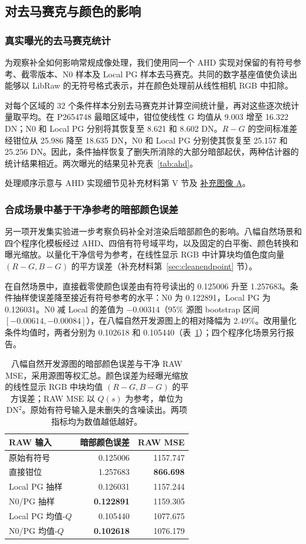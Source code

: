 \documentclass[10pt,twocolumn,journal]{IEEEtran}
\begin{document}
\subsection{对去马赛克与颜色的影响}\label{sec:downstream}
\subsubsection{真实曝光的去马赛克统计}
为观察补全如何影响常规成像处理，我们使用同一个 AHD 实现对保留的有符号参考、截零版本、N0 样本及 Local PG 样本去马赛克。共同的数字基座值使负读出能够以 LibRaw 的无符号格式表示，并在颜色处理前从线性相机 RGB 中扣除。

对每个区域的 32 个条件样本分别去马赛克并计算空间统计量，再对这些逐次统计量取平均。在 P2654748 最暗区域中，钳位使线性 G 均值从 9.003 增至 16.322 DN；N0 和 Local PG 分别将其恢复至 8.621 和 8.602 DN。$R-G$ 的空间标准差经钳位从 25.986 降至 18.635 DN，N0 和 Local PG 分别使其恢复至 25.157 和 25.256 DN。因此，条件抽样恢复了删失所消除的大部分暗部起伏，两种估计器的统计结果相近。两次曝光的结果见补充表~\ref{tab:ahd}。

处理顺序示意与 AHD 实现细节见补充材料第 V 节及 \href{visual_zh.pdf}{补充图像 A}。

\subsubsection{合成场景中基于干净参考的暗部颜色误差}
另一项开发集实验进一步考察负码补全对渲染后暗部颜色的影响。八幅自然场景和四个程序化模板经过 AHD、四倍有符号域平均，以及固定的白平衡、颜色转换和曝光缩放。以量化干净信号为参考，在线性显示 RGB 中计算块均值色度向量 $(R-G,B-G)$ 的平方误差（补充材料第~\ref{sec:cleanendpoint} 节）。

在自然场景中，直接截零使颜色误差由有符号读出的 0.125006 升至 1.257683。条件抽样使误差降至接近有符号参考的水平：N0 为 0.122891，Local PG 为 0.126031。N0 减 Local 的差值为 $-0.00314$（95\% 源图 bootstrap 区间 $[-0.00614,-0.00084]$），在八幅自然开发源图上的相对降幅为 2.49\%。改用量化条件均值时，两者分别为 0.102618 和 0.105440（表~\ref{tab:cleanendpoint}）；四个程序化场景另行报告。

\begin{table}[t]
\centering\small
\setlength{\tabcolsep}{4pt}
\caption{八幅自然开发源图的暗部颜色误差与干净 RAW MSE，采用源图等权汇总。颜色误差为经曝光缩放的线性显示 RGB 中块均值 $(R-G,B-G)$ 的平方误差；RAW MSE 以 $Q(s)$ 为参考，单位为 DN$^2$。原始有符号输入是未删失的含噪读出。两项指标均为数值越低越好。}
\label{tab:cleanendpoint}
\begin{tabular}{@{}lrr@{}}
\toprule
RAW 输入 & 暗部颜色误差 & RAW MSE\\
\midrule
原始有符号 & 0.125006 & 1157.747\\
直接钳位 & 1.257683 & \textbf{866.698}\\
Local PG 抽样 & 0.126031 & 1157.244\\
N0/PG 抽样 & \textbf{0.122891} & 1159.305\\
Local PG 均值-$Q$ & 0.105440 & 1077.675\\
N0/PG 均值-$Q$ & \textbf{0.102618} & 1076.179\\
\bottomrule
\end{tabular}
\end{table}
\end{document}
